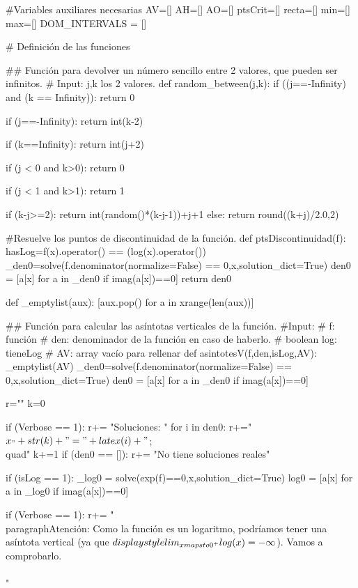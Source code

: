 \begin{sagesilent}

#Variables auxiliares necesarias
AV=[]
AH=[]
AO=[]
ptsCrit=[]
recta=[]
min=[]
max=[]
DOM_INTERVALS = []



# Definición de las funciones

## Función para devolver un número sencillo entre 2 valores, que pueden ser infinitos.
# Input: j,k los 2 valores.
def random_between(j,k):
 if ((j==-Infinity) and (k == Infinity)):
  return 0

 if (j==-Infinity):
  return int(k-2)

 if (k==Infinity):
  return int(j+2)

 if (j < 0 and k>0):
  return 0

 if (j < 1 and k>1):
  return 1


 if (k-j>=2):
  return int(random()*(k-j-1))+j+1
 else:
  return round((k+j)/2.0,2)

#Resuelve los puntos de discontinuidad de la función.
def ptsDiscontinuidad(f):
    hasLog=f(x).operator() == (log(x).operator())
    _den0=solve(f.denominator(normalize=False) == 0,x,solution_dict=True)
    den0 = [a[x] for a in _den0 if imag(a[x])==0]
    return den0

def _emptylist(aux):
    [aux.pop() for a in xrange(len(aux))]
    
## Función para calcular las asíntotas verticales de la función.
#Input:
# f: función
# den: denominador de la función en caso de haberlo.
# boolean log: tieneLog 
# AV: array vacío para rellenar
def asintotesV(f,den,isLog,AV):
    _emptylist(AV)
    _den0=solve(f.denominator(normalize=False) == 0,x,solution_dict=True)
    den0 = [a[x] for a in _den0 if imag(a[x])==0]

    r=""
    k=0

    if (Verbose == 1):
        r+= "Soluciones: "
        for i in den0:
            r+="$x_"+str(k)+"="+latex(i)+" $;\\quad"
            k+=1
        if (den0 == []):
            r+= "No tiene soluciones reales"

    if (isLog == 1):
        _log0 = solve(exp(f)==0,x,solution_dict=True)
        log0 = [a[x] for a in _log0 if imag(a[x])==0]  

        if (Verbose == 1):
            r+= "\\paragraph{Atención: } Como la función es un logaritmo, podríamos tener una asíntota vertical (ya que $\\displaystyle\\lim_{x\\mapsto 0^+} \\log(x) = -\infty$). Vamos a comprobarlo.\\\\"


\end{sagesilent}
